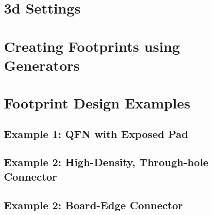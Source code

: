 \section{3d Settings}

\section{Creating Footprints using Generators}

\section{Footprint Design Examples}
\subsection{Example 1: QFN with Exposed Pad}
\subsection{Example 2: High-Density, Through-hole Connector}
\subsection{Example 2: Board-Edge Connector}
